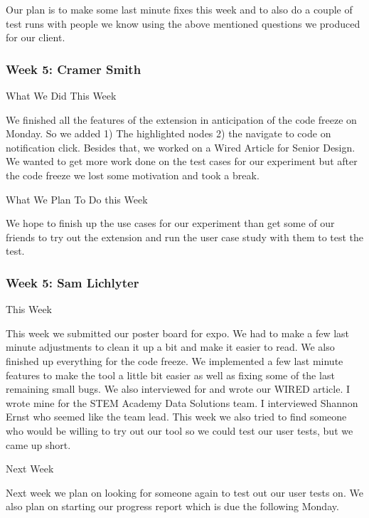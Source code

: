 Our plan is to make some last minute fixes this week and to also do a couple of test runs with people we know using the above mentioned questions we produced for our client. \\ 

 \subsubsection{Week 5: Cramer Smith}

What We Did This Week



We finished all the features of the extension in anticipation of the code freeze on Monday. So we added 1) The highlighted nodes 2) the navigate to code on notification click. Besides that, we worked on a Wired Article for Senior Design. We wanted to get more work done on the test cases for our experiment but after the code freeze we lost some motivation and took a break. 



What We Plan To Do this Week



We hope to finish up the use cases for our experiment than get some of our friends to try out the extension and run the user case study with them to test the test.  \\ 

 \subsubsection{Week 5: Sam Lichlyter}

This Week

This week we submitted our poster board for expo. We had to make a few last minute adjustments to clean it up a bit and make it easier to read. We also finished up everything for the code freeze. We implemented a few last minute features to make the tool a little bit easier as well as fixing some of the last remaining small bugs. We also interviewed for and wrote our WIRED article. I wrote mine for the STEM Academy Data Solutions team. I interviewed Shannon Ernst who seemed like the team lead. This week we also tried to find someone who would be willing to try out our tool so we could test our user tests, but we came up short.



Next Week

Next week we plan on looking for someone again to test out our user tests on. We also plan on starting our progress report which is due the following Monday. \\ 

